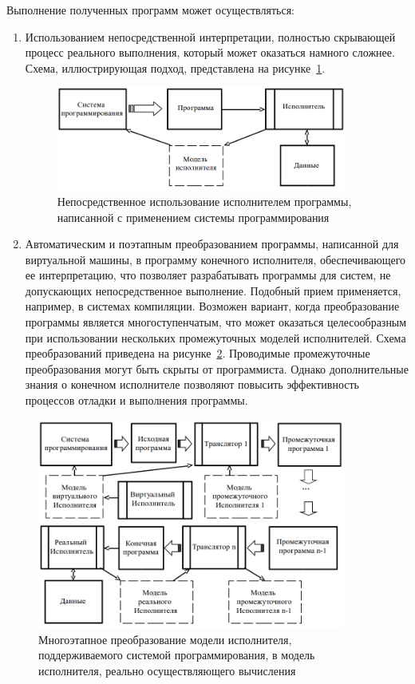 Выполнение полученных программ может осуществляться:

\begin{enumerate}
    \item Использованием непосредственной интерпретации, полностью скрывающей процесс реального выполнения, который может оказаться намного сложнее. Схема, иллюстрирующая подход, представлена на рисунке~\ref{fig01-06}.
\begin{figure}[htbp]
    \centering
    \includegraphics[width=0.9\textwidth]{img/fig01-06.png}
    \caption{Непосредственное использование исполнителем программы, написанной с применением системы программирования}
    \label{fig01-06}
\end{figure}
    \item Автоматическим и поэтапным преобразованием программы, написанной для виртуальной машины, в программу конечного исполнителя, обеспечивающего ее интерпретацию, что позволяет разрабатывать программы для систем, не допускающих непосредственное выполнение. Подобный прием применяется, например, в системах компиляции. Возможен вариант, когда преобразование программы является многоступенчатым, что может оказаться целесообразным при использовании нескольких промежуточных моделей исполнителей. Схема преобразований приведена на рисунке~\ref{fig01-07}. Проводимые промежуточные преобразования могут быть скрыты от программиста. Однако дополнительные знания о конечном исполнителе позволяют повысить эффективность процессов отладки и выполнения программы.
\end{enumerate}

\begin{figure}[htbp]
    \centering
    \includegraphics[width=0.9\textwidth]{img/fig01-07.png}
    \caption{Многоэтапное преобразование модели исполнителя, поддерживаемого системой программирования, в модель исполнителя, реально осуществляющего вычисления}
    \label{fig01-07}
\end{figure}

